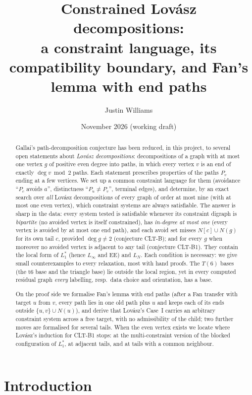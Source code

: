 \documentclass[11pt]{amsart}
\title[Constrained Lov\'asz decompositions]{Constrained Lov\'asz decompositions:\\
a constraint language, its compatibility boundary, and Fan's lemma with end paths}
\author{Justin Williams}
\date{November 2026 (working draft)}
\theoremstyle{definition}
\begin{document}
\begin{abstract}
Gallai's path-decomposition conjecture has been reduced, in this project, to several open
statements about \emph{Lov\'asz decompositions}: decompositions of a graph with at most one
vertex $g$ of positive even degree into paths, in which every vertex $v$ is an end of exactly
$\deg v\bmod 2$ paths. Each statement prescribes properties of the paths $P_v$ ending at a few
vertices. We set up a common constraint language for them (avoidance ``$P_c$ avoids $a$'',
distinctness ``$P_u\ne P_v$'', terminal edges), and determine, by an exact search over
\emph{all} Lov\'asz decompositions of every graph of order at most nine (with at most one even
vertex), which constraint systems are always satisfiable. The answer is sharp in the data: every
system tested is satisfiable whenever its constraint digraph is \emph{bipartite} (no avoided vertex is itself constrained), has
\emph{in-degree at most one} (every vertex is avoided by at most one end path), and each avoid set
misses $N[c]\cup N(g)$ for its own tail $c$, provided $\deg g\ne2$ (conjecture CLT-B); and for every
$g$ when moreover no avoided vertex is adjacent to any tail (conjecture CLT-B1). They contain the
local form of $L_1^*$ (hence $L_\infty$ and EE) and $L_N$. Each condition is necessary: we give
small counterexamples to every relaxation, most with hand proofs. The $T(6)$ bases (the t6 base and
the triangle base) lie outside the local region, yet in every computed residual graph \emph{every}
labelling, resp.\ data choice and orientation, has a base.

On the proof side we formalise Fan's lemma with end paths (after a Fan transfer with target $u$
from $v$, every path lies in one old path plus $u$ and keeps each of its ends outside
$\{u,v\}\cup N(u)$), and derive that Lov\'asz's Case~I carries an arbitrary constraint system across
a free target, with no admissibility of the child; two further moves are formalised for several
tails. When the even vertex exists we locate where Lov\'asz's induction for CLT-B1 stops: at the
multi-constraint version of the blocked configuration of $L_1^*$, at adjacent tails, and at tails
with a common neighbour.
\end{abstract}
\maketitle

\section{Introduction}\label{sec:intro}
\end{document}
